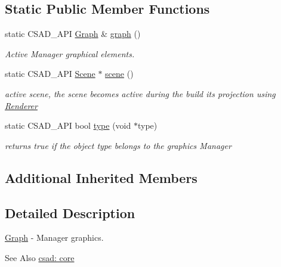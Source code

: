 \subsection*{Static Public Member Functions}
\begin{DoxyCompactItemize}
\item 
\hypertarget{classcsad_1_1_graph_a7f35986797f46f1d7b9f02aaec278ee8}{static C\-S\-A\-D\-\_\-\-A\-P\-I \hyperlink{classcsad_1_1_graph}{Graph} \& \hyperlink{classcsad_1_1_graph_a7f35986797f46f1d7b9f02aaec278ee8}{graph} ()}\label{classcsad_1_1_graph_a7f35986797f46f1d7b9f02aaec278ee8}

\begin{DoxyCompactList}\small\item\em Active Manager graphical elements. \end{DoxyCompactList}\item 
\hypertarget{classcsad_1_1_graph_ad14c015d4c5b3f2dd101851a50ae2e08}{static C\-S\-A\-D\-\_\-\-A\-P\-I \hyperlink{classcsad_1_1_scene}{Scene} $\ast$ \hyperlink{classcsad_1_1_graph_ad14c015d4c5b3f2dd101851a50ae2e08}{scene} ()}\label{classcsad_1_1_graph_ad14c015d4c5b3f2dd101851a50ae2e08}

\begin{DoxyCompactList}\small\item\em active scene, the scene becomes active during the build its projection using \hyperlink{classcsad_1_1_renderer}{Renderer} \end{DoxyCompactList}\item 
\hypertarget{classcsad_1_1_graph_ac988039675f40f70ca7910adf993c3df}{static C\-S\-A\-D\-\_\-\-A\-P\-I bool \hyperlink{classcsad_1_1_graph_ac988039675f40f70ca7910adf993c3df}{type} (void $\ast$type)}\label{classcsad_1_1_graph_ac988039675f40f70ca7910adf993c3df}

\begin{DoxyCompactList}\small\item\em returns true if the object type belongs to the graphics Manager \end{DoxyCompactList}\end{DoxyCompactItemize}
\subsection*{Additional Inherited Members}


\subsection{Detailed Description}
\hyperlink{classcsad_1_1_graph}{Graph} -\/ Manager graphics. 

\begin{DoxySeeAlso}{See Also}
\hyperlink{group__core}{csad\-: core} 
\end{DoxySeeAlso}
